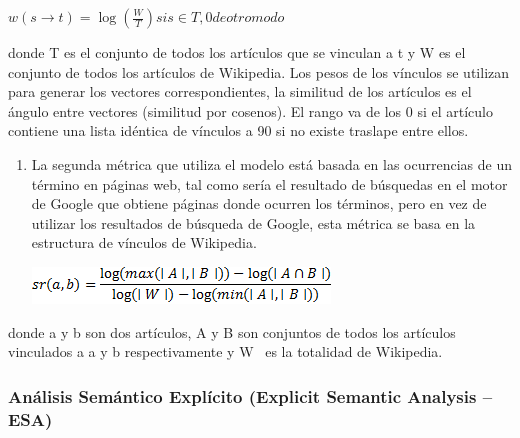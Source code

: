 \documentclass[letterpaper]{article}
\newcounter{saveenum}
\newcommand\liststyleLxv{%
\renewcommand\theenumi{\arabic{enumi}}
\renewcommand\theenumii{\arabic{enumii}}
\renewcommand\theenumiii{\arabic{enumiii}}
\renewcommand\theenumiv{\arabic{enumiv}}
\renewcommand\labelenumi{\theenumi.}
\renewcommand\labelenumii{\theenumii.}
\renewcommand\labelenumiii{\theenumiii.}
\renewcommand\labelenumiv{\theenumiv.}
}
\begin{document}
\bigskip

{\centering  $w(s\rightarrow t)=\log (\frac{W}{T})\mathit{si}s\in
T,0\mathit{de}\mathit{otro}\mathit{modo}$\par}


\bigskip

{\sffamily
donde T es el conjunto de todos los art\'iculos que se vinculan a t y W
es el conjunto de todos los art\'iculos de Wikipedia. Los pesos de los
v\'inculos se utilizan para generar los vectores correspondientes, la
similitud de los art\'iculos es el \'angulo entre vectores (similitud
por cosenos). El rango va de los 0{\textdegree} si el art\'iculo
contiene una lista id\'entica de v\'inculos a 90{\textdegree} si no
existe traslape entre ellos.}


\bigskip

\liststyleLxv
\setcounter{saveenum}{\value{enumi}}
\begin{enumerate}
\setcounter{enumi}{\value{saveenum}}
\item {\sffamily
La segunda m\'etrica que utiliza el modelo est\'a basada en las
ocurrencias de un t\'ermino en p\'aginas web, tal como ser\'ia el
resultado de b\'usquedas en el motor de Google que obtiene p\'aginas
donde ocurren los t\'erminos, pero en vez de utilizar los resultados de
b\'usqueda de Google, esta m\'etrica se basa en la estructura de
v\'inculos de Wikipedia.}

{\centering 
\includegraphics[width=7.909cm,height=0.979cm]{Capitulo2-img13.png}
\par}
\end{enumerate}

\bigskip

{\sffamily
donde a y b son dos art\'iculos, A y B son conjuntos de todos los
art\'iculos vinculados a a y b respectivamente y W \ es la totalidad de
Wikipedia.}


\bigskip

\subsubsection[An\'alisis Sem\'antico Expl\'icito (Explicit Semantic
Analysis {}-- ESA)]{An\'alisis Sem\'antico Expl\'icito (Explicit
Semantic Analysis -- ESA)}
\hypertarget{RefHeading10788782078703}{}
\bigskip
\end{document}
